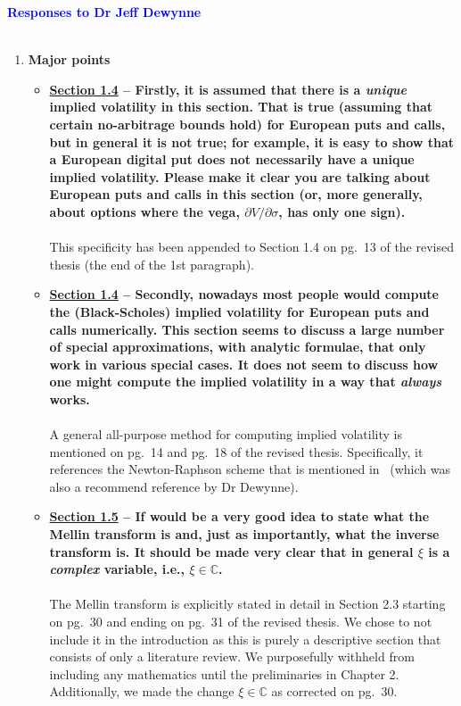 \documentclass{article}
\begin{document}
\textcolor{blue}{\textbf{Responses to Dr Jeff Dewynne\\ \\}}
\begin{enumerate}
	\item \textbf{
	Major points}
	\begin{itemize}
		\item \textbf{\underline{Section 1.4} -- Firstly, it is assumed that there is a \emph{unique} implied volatility in this section. That is true (assuming that certain no-arbitrage bounds hold) for European puts and calls, but in general it is not true; for example, it is easy to show that a European digital put does not necessarily have a unique implied volatility. Please make it clear you are talking about European puts and calls in this section (or, more generally, about options where the vega, $\partial V / \partial \sigma$, has only one sign).\\ \\}
		This specificity has been appended to Section 1.4 on pg.~13 of the revised thesis (the end of the 1st paragraph).
		
		\item \textbf{\underline{Section 1.4} -- Secondly, nowadays most people would compute the (Black-Scholes) implied volatility for European puts and calls numerically. This section seems to discuss a large number of special approximations, with analytic formulae, that only work in various special cases. It does not seem to discuss how one might compute the implied volatility in a way that \emph{always} works.
		\\ \\}
		A general all-purpose method for computing implied volatility is mentioned on pg.~14 and pg.~18 of the revised thesis. Specifically, it references the Newton-Raphson scheme that is mentioned in~\cite{Manaster1982} (which was also a recommend reference by Dr Dewynne).
		
		\item \textbf{\underline{Section 1.5} -- If would be a very good idea to state what the Mellin transform is and, just as importantly, what the inverse transform is. It should be made very clear that in general $\xi$ is a \emph{complex} variable, i.e., $\xi \in \mathbb{C}$.
		\\ \\}
		The Mellin transform is explicitly stated in detail in Section 2.3 starting on pg.~30 and ending on pg.~31 of the revised thesis. We chose to not include it in the introduction as this is purely a descriptive section that consists of only a literature review. We purposefully withheld from including any mathematics until the preliminaries in Chapter 2. Additionally, we made the change $\xi \in \mathbb{C}$ as corrected on pg.~30.
		

\end{itemize}
\end{enumerate}
\end{document}
